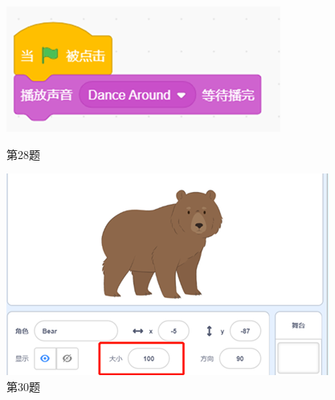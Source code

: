 \documentclass[10pt, a4paper]{article}
\begin{document}
\begin{figure}[htbp]
\begin{minipage}[t]{.23\textwidth}
\begin{minipage}[t]{.23\textwidth}
            \end{minipage}
            \begin{minipage}[t]{.7\textwidth}
                \centering
                \includegraphics[width=\textwidth]{28-2.png}
            \end{minipage}
            \caption*{第28题}
        \end{minipage}
        \begin{minipage}[t]{.23\textwidth}
            \centering
            \includegraphics[width=\textwidth]{30.png}
            \caption*{第30题}
        \end{minipage}
        \begin{minipage}[t]{.13\textwidth}
            \centering

\end{minipage}
\end{figure}
\end{document}

